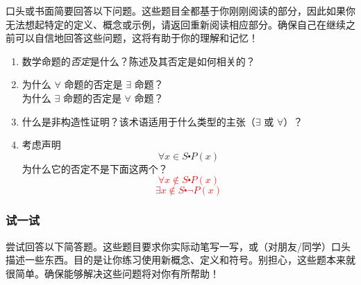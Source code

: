 口头或书面简要回答以下问题。这些题目全都基于你刚刚阅读的部分，因此如果你无法想起特定的定义、概念或示例，请返回重新阅读相应部分。确保自己在继续之前可以自信地回答这些问题，这将有助于你的理解和记忆！

\begin{enumerate}[label=(\arabic*)]
    \item 数学命题的\emph{否定}是什么？陈述及其否定是如何相关的？
    \item 为什么 $\forall$ 命题的否定是 $\exists$ 命题？\\
        为什么 $\exists$ 命题的否定是 $\forall$ 命题？
    \item 什么是非构造性证明？该术语适用于什么类型的主张（$\exists$ 或 $\forall$）？
    \item 考虑声明
        \[\forall x \in S \centerdot P(x)\]
        为什么它的否定不是下面这两个？
        \textcolor{red}{
            \[\forall x \notin S \centerdot P(x)\]
            \[\exists x \notin S \centerdot \neg P(x)\]
        }
\end{enumerate}

\subsubsection*{试一试}

尝试回答以下简答题。这些题目要求你实际动笔写一写，或（对朋友/同学）口头描述一些东西。目的是让你练习使用新概念、定义和符号。别担心，这些题本来就很简单。确保能够解决这些问题将对你有所帮助！

